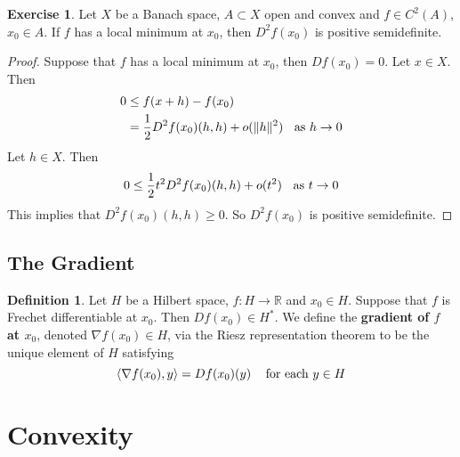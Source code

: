 \documentclass[12pt]{amsart}
\theoremstyle{definition}
\newtheorem{defn}[definition]{Definition}
\newtheorem{ex}[definition]{Exercise}
\newcommand{\R}{\mathbb{R}}
\renewcommand{\r}{\rangle}
\renewcommand{\l}{\langle}
\newcommand{\lex}[1]{\label{ex:#1}}
\newcommand{\ld}[1]{\label{defn:#1}}
\begin{document}
	
	
	
	\begin{ex} \lex{}
	Let $X$ be a Banach space, $A \subset X$ open and convex and $f\in C^{2}(A)$, $x_0 \in A$. If $f$ has a local minimum at $x_0$, then $D^2f(x_0)$ is positive semidefinite.   
	\end{ex}
	
	\begin{proof}
	Suppose that $f$ has a local minimum at $x_0$, then $Df(x_0) = 0$. Let $x \in X$. Then 
	\begin{align*}
	0 
	& \leq f(x+h) - f(x_0) \\
	&= \frac{1}{2} D^2f(x_0)(h,h) +o(\|h\|^2) \hspace{.2cm} \text{ as } h \rightarrow 0
	\end{align*}
	Let $h \in X$. Then $$0 \leq \frac{1}{2} t^2 D^2f(x_0)(h,h) +o(t^2) \hspace{.2cm} \text{ as } t \rightarrow 0$$
	This implies that $D^2f(x_0)(h,h) \geq 0$. So $D^2f(x_0)$ is positive semidefinite.
	\end{proof}

	
	
	
	
	
	\newpage
	\subsection{The Gradient}
	
	\begin{defn} \ld{}
	Let $H$ be a Hilbert space, $f: H \rightarrow \R$ and $x_0 \in H$. Suppose that $f$ is Frechet differentiable at $x_0$. Then $Df(x_0) \in H^*$. We define the \textbf{gradient of $f$ at $x_0$}, denoted $\nabla f(x_0) \in H$, via the Riesz representation theorem to be the unique element of $H$ satisfying $$\l \nabla f(x_0), y \r = Df(x_0)(y) \hspace{.3cm} \text{ for each } y \in H$$
	\end{defn}
	
	
	
	
	
	
	
	
	
	
	

	
	
	
	
	
	
	\newpage
	\section{Convexity}
	
\end{document}
